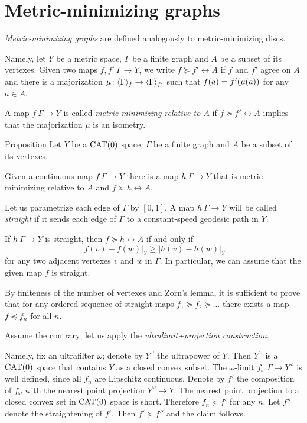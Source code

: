 \section{Metric-minimizing graphs}\label{Metric-minimizing graphs}

\emph{Metric-minimizing graphs} are defined analogously to metric-minimizing discs.

Namely, let $Y$ be a metric space, $\Gamma$ be a finite graph and $A$ be a subset of its vertexes.
Given two maps $f,f'\:\Gamma\to Y$, we write $f\succcurlyeq f'\rel A$ if $f$ and $f'$ agree on $A$ 
and there is a majorization $\mu\colon\langle\Gamma\rangle_f\to \langle\Gamma\rangle_{f'}$
such that $f(a)\zz=f'(\mu(a))$ for any $a\in A$.

A map $f\:\Gamma\to Y$ is called \emph{metric-minimizing relative to $A$} if $f\succcurlyeq f'\rel A$ implies that the majorization $\mu$ is an isometry.

\begin{thm}{Proposition}\label{prop:metric-min-graph-exist}
Let $Y$ be a $\mathop{\rm CAT}\nolimits(0)$ space, 
$\Gamma$ be a finite graph and $A$ be a subset of its vertexes.

Given a continuous map $f\:\Gamma\to Y$ there is a map $h\:\Gamma\to Y$ 
that is metric-minimizing relative to $A$ and $f\succcurlyeq h\rel A$.
\end{thm}

Let us parametrize each edge of $\Gamma$ by $[0,1]$.
A map $h\:\Gamma\to Y$ will be called \emph{straight} if it
sends each edge of $\Gamma$ to a constant-speed geodesic path in $Y$.

If $h\:\Gamma\to Y$ is straight, then $f\succcurlyeq h\rel A$ if and only if 
\[|f(v)-f(w)|_Y\ge |h(v)-h(w)|_Y\]
for any two adjacent vertexes $v$ and $w$ in $\Gamma$.
In particular, we can assume that the given map $f$ is straight.

By finiteness of the number of vertexes and Zorn's lemma,
it is sufficient to prove that for any ordered sequence of straight maps $f_1\succcurlyeq f_2\succcurlyeq \dots$ there exists a map $f\preccurlyeq f_n$ for all $n$.

Assume the contrary; let us apply the \emph{ultralimit+projection construction}.

Namely, fix an ultrafilter $\omega$; denote by $Y^\omega$ the ultrapower of $Y$. 
Then $Y^\omega$
is a $\mathop{\rm CAT}\nolimits(0)$ space that contains $Y$ as a closed convex subset. 
The $\omega$-limit $f_\omega\:\Gamma\to Y^\omega$ is well defined, since all $f_n$ are Lipschitz continuous. 
Denote by $f'$ the composition of $f_\omega$ with the nearest point projection $Y^\omega\to Y$.
The nearest point projection to a closed convex set in $\mathop{\rm CAT}\nolimits(0)$ space is short.
Therefore $f_n\succcurlyeq f'$ for any $n$.
Let $f''$ denote the straightening of $f'$.
Then $f'\succcurlyeq f''$ and the claim follows.
\qeds


